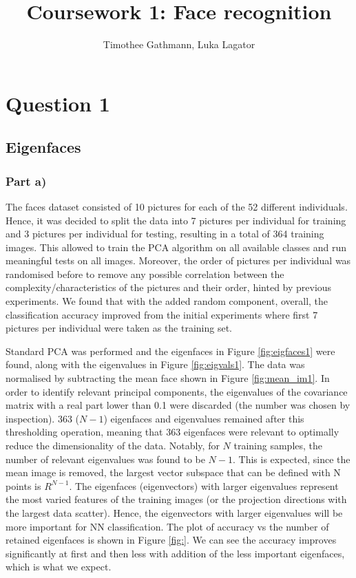 \documentclass[10pt,technote]{IEEEtran}
\title{Coursework 1: Face recognition }
\author{Timothee Gathmann, Luka Lagator}
\begin{document}
\maketitle


\section{Question 1}
\subsection{Eigenfaces}
\subsubsection{Part a)}
The faces dataset consisted of 10 pictures for each of the 52 different individuals. Hence, it was decided to split the data into 7 pictures per individual for training and 3 pictures per individual for testing, resulting in a total of 364 training images. This allowed to train the PCA algorithm on all available classes and run meaningful tests on all images. Moreover, the order of pictures per individual was randomised before to remove any possible correlation between the complexity/characteristics of the pictures and their order, hinted by previous experiments. We found that with the added random component, overall, the classification accuracy improved from the initial experiments where first 7  pictures per individual were taken as the training set.

Standard PCA was performed and the eigenfaces in Figure \ref{fig:eigfaces1} were found, along with the eigenvalues in Figure \ref{fig:eigvals1}. The data was normalised by subtracting the mean face shown in Figure \ref{fig:mean_im1}. In order to identify relevant principal components, the eigenvalues of the covariance matrix with a real part lower than 0.1 were discarded (the number was chosen by inspection). 363 ($N - 1$) eigenfaces and eigenvalues remained after this thresholding operation, meaning that 363 eigenfaces were relevant to optimally reduce the dimensionality of the data. Notably, for $N$ training samples, the number of relevant eigenvalues was found to be $N - 1$. This is expected, since the mean image is removed, the largest vector subspace that can be defined with N points is $R^{N-1}$.
The eigenfaces (eigenvectors) with larger eigenvalues represent the most varied features of the training images (or the projection directions with the largest data scatter). Hence, the eigenvectors with larger eigenvalues will be more important for NN classification.
The plot of accuracy vs the number of retained eigenfaces is shown in Figure \ref{fig:}. We can see the accuracy improves significantly at first and then less with addition of the less important eigenfaces, which is what we expect.
\end{document}
